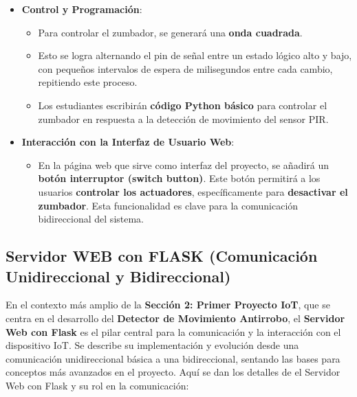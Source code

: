 \documentclass{report}
\begin{document}
\begin{itemize}
    \item \textbf{Control y Programación}:
    \begin{itemize}
        \item Para controlar el zumbador, se generará una \textbf{onda cuadrada}.
        \item Esto se logra alternando el pin de señal entre un estado lógico alto y bajo, con pequeños intervalos de espera de milisegundos entre cada 
        cambio, repitiendo este proceso.
        \item Los estudiantes escribirán \textbf{código Python básico} para controlar el zumbador en respuesta a la detección de movimiento del sensor PIR.
    \end{itemize}

    \item \textbf{Interacción con la Interfaz de Usuario Web}:
    \begin{itemize}
        \item En la página web que sirve como interfaz del proyecto, se añadirá un \textbf{botón interruptor (switch button)}. Este botón permitirá a 
        los usuarios \textbf{controlar los actuadores}, específicamente para \textbf{desactivar el zumbador}. Esta funcionalidad es clave para la 
        comunicación bidireccional del sistema.
    \end{itemize}
\end{itemize}

\subsection{Servidor WEB con FLASK (Comunicación Unidireccional y Bidireccional)}
En el contexto más amplio de la \textbf{Sección 2: Primer Proyecto IoT}, que se centra en el desarrollo del \textbf{Detector de Movimiento Antirrobo}, el 
\textbf{Servidor Web con Flask} es el pilar central para la comunicación y la interacción con el dispositivo IoT. Se describe su implementación y 
evolución desde una comunicación unidireccional básica a una bidireccional, sentando las bases para conceptos más avanzados en el proyecto. Aquí se dan los 
detalles de el Servidor Web con Flask y su rol en la comunicación:
\end{document}
